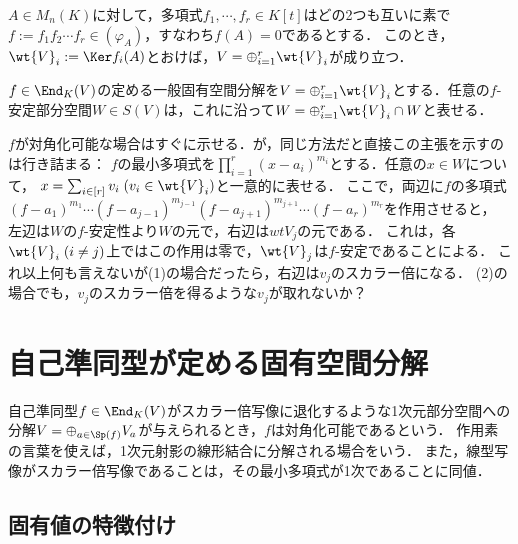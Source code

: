 \documentclass[uplatex, dvipdfmx]{jsreport}
\begin{document}
\begin{theorem}[一般化された一般化固有空間分解]
    $A\in M_n(K)$に対して，多項式$f_1,\cdots,f_r\in K[t]$はどの2つも互いに素で$f:=f_1f_2\cdots f_r\in(\varphi_A)$，すなわち$f(A)=0$であるとする．
    このとき，$\wt{V}_i:=\Ker f_i(A)$とおけば，$V=\oplus_{i=1}^r\wt{V}_i$が成り立つ．
\end{theorem}

\begin{corollary}[安定部分空間は一般化固有空間分解に沿って分解出来る]
    $f\in\End_K(V)$の定める一般固有空間分解を$V=\oplus_{i=1}^r\wt{V}_i$とする．任意の$f$-
    安定部分空間$W\in S(V)$は，これに沿って$W=\oplus_{i=1}^r\wt{V}_i\cap W$と表せる．
\end{corollary}
\begin{Proof}
    $f$が対角化可能な場合はすぐに示せる．が，同じ方法だと直接この主張を示すのは行き詰まる：
    $f$の最小多項式を$\prod^r_{i=1}(x-a_i)^{m_i}$とする．任意の$x\in W$について，
    $x=\sum_{i\in[r]}v_i\;(v_i\in\wt{V}_i)$と一意的に表せる．
    ここで，両辺に$f$の多項式$(f-a_1)^{m_1}\cdots(f-a_{j-1})^{m_{j-1}}(f-a_{j+1})^{m_{j+1}}\cdots(f-a_r)^{m_r}$を作用させると，
    左辺は$W$の$f$-安定性より$W$の元で，右辺は$wt{V}_j$の元である．
    これは，各$\wt{V}_i\;(i\ne j)$上ではこの作用は零で，$\wt{V}_j$は$f$-安定であることによる．
    これ以上何も言えないが(1)の場合だったら，右辺は$v_j$のスカラー倍になる．
    (2)の場合でも，$v_j$のスカラー倍を得るような$v_j$が取れないか？
\end{Proof}

\section{自己準同型が定める固有空間分解}

\begin{tcolorbox}[colframe=ForestGreen, colback=ForestGreen!10!white,breakable,colbacktitle=ForestGreen!40!white,coltitle=black,fonttitle=\bfseries\sffamily,
title=]
    自己準同型$f\in\End_K(V)$がスカラー倍写像に退化するような1次元部分空間への分解$V=\oplus_{a\in\Sp(f)}V_a$が与えられるとき，$f$は対角化可能であるという．
    作用素の言葉を使えば，1次元射影の線形結合に分解される場合をいう．
    また，線型写像がスカラー倍写像であることは，その最小多項式が1次であることに同値．
\end{tcolorbox}

\subsection{固有値の特徴付け}
\end{document}

